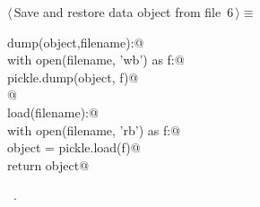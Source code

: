 \documentclass[11pt,oneside]{article}	%
\begin{document}
\begin{flushleft} \small
\begin{minipage}{\linewidth} \label{scrap9}
\protect{}$\langle\,$Save and restore data object from file\nobreak\ {\footnotesize 6}$\,\rangle\equiv$
\vspace{-1ex}
\begin{list}{}{} \item
\mbox{}\verb@def dump(object,filename):@\\
\mbox{}\verb@   with open(filename, 'wb') as f:@\\
\mbox{}\verb@       pickle.dump(object, f)@\\
\mbox{}\verb@       @\\
\mbox{}\verb@def load(filename):@\\
\mbox{}\verb@   with open(filename, 'rb') as f:@\\
\mbox{}\verb@       object = pickle.load(f)@\\
\mbox{}\verb@   return object@\\
\mbox{}\verb@@{\NWsep}
\end{list}
\vspace{-1ex}
\footnotesize\addtolength{\baselineskip}{-1ex}
\begin{list}{}{\setlength{\itemsep}{-\parsep}\setlength{\itemindent}{-\leftmargin}}
\item \NWtxtMacroRefIn\ .
\end{list}
\end{minipage}\\[4ex]
\end{flushleft}
\end{document}
